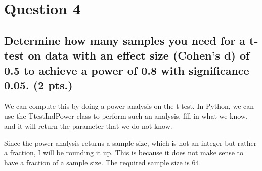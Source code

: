 \documentclass[a4paper]{article}
\begin{document}
\section{Question 4}
\subsection{Determine how many samples you need for a t-test on data with an effect size (Cohen's d) of 0.5 to achieve a power of 0.8 with significance 0.05. (2 pts.)}
We can compute this by doing a power analysis on the t-test. In Python, we can use the \newline TtestIndPower class to perform such an analysis, fill in what we know, and it will return the parameter that we do not know.
Since the power analysis returns a sample size, which is not an integer but rather a fraction, I will be rounding it up. This is because it does not make sense to have a fraction of a sample size.
The required sample size is 64.
\end{document}
